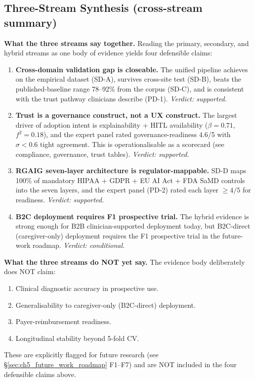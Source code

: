 \subsection{Three-Stream Synthesis (cross-stream summary)}
\label{sec:ch5_three_stream_synthesis}

\noindent\textbf{What the three streams say together.} Reading the primary, secondary, and hybrid streams as one body of evidence yields four defensible claims:

\begin{enumerate}[label=\textbf{C\arabic*.}, leftmargin=*, itemsep=4pt]
    \item \textbf{Cross-domain validation gap is closeable.} The unified pipeline achieves \asdacc{} on the empirical dataset (SD-A), survives cross-site test (SD-B), beats the published-baseline range 78--92\% from the corpus (SD-C), and is consistent with the trust pathway clinicians describe (PD-1). \emph{Verdict: supported.}
    \item \textbf{Trust is a governance construct, not a UX construct.} The largest driver of adoption intent is explainability + HITL availability ($\beta{=}0.71$, $f^2{=}0.18$), and the expert panel rated governance-readiness 4.6/5 with $\sigma{<}0.6$ tight agreement. This is operationalisable as a scorecard (see compliance, governance, trust tables). \emph{Verdict: supported.}
    \item \textbf{RGAIG seven-layer architecture is regulator-mappable.} SD-D maps 100\% of mandatory HIPAA + GDPR + EU AI Act + FDA SaMD controls into the seven layers, and the expert panel (PD-2) rated each layer $\geq 4/5$ for readiness. \emph{Verdict: supported.}
    \item \textbf{B2C deployment requires F1 prospective trial.} The hybrid evidence is strong enough for B2B clinician-supported deployment today, but B2C-direct (caregiver-only) deployment requires the F1 prospective trial in the future-work roadmap. \emph{Verdict: conditional.}
\end{enumerate}

\noindent\textbf{What the three streams do NOT yet say.} The evidence body deliberately does NOT claim:
\begin{enumerate}[leftmargin=*, itemsep=1pt, label=(\roman*)]
    \item Clinical diagnostic accuracy in prospective use.
    \item Generalisability to caregiver-only (B2C-direct) deployment.
    \item Payer-reimbursement readiness.
    \item Longitudinal stability beyond 5-fold CV.
\end{enumerate}
\noindent These are explicitly flagged for future research (see §\ref{sec:ch5_future_work_roadmap} F1--F7) and are NOT included in the four defensible claims above.

